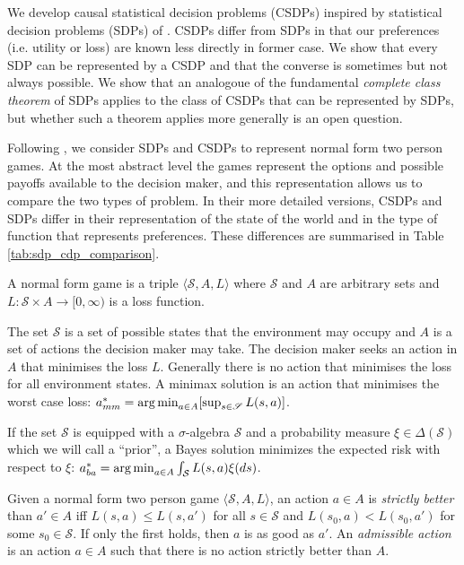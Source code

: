 We develop causal statistical decision problems (CSDPs) inspired by statistical decision problems (SDPs) of \citet{wald_statistical_1950}. CSDPs differ from SDPs in that our preferences (i.e. utility or loss) are known less directly in former case. We show that every SDP can be represented by a CSDP and that the converse is sometimes but not always possible. We show that an analogoue of the fundamental \emph{complete class theorem} of SDPs applies to the class of CSDPs that can be represented by SDPs, but whether such a theorem applies more generally is an open question.

Following \citep{toutenburg_ferguson_1967}, we consider SDPs and CSDPs to represent normal form two person games. At the most abstract level the games represent the options and possible payoffs available to the decision maker, and this representation allows us to compare the two types of problem. In their more detailed versions,  CSDPs and SDPs differ in their representation of the state of the world and in the type of function that represents preferences. These differences are summarised in Table \ref{tab:sdp_cdp_comparison}.

\begin{definition}
A normal form game is a triple $\langle \mathscr{S}, A, L\rangle$ where $\mathscr{S}$ and $A$ are arbitrary sets and $L:\mathscr{S}\times A\to [0,\infty)$ is a loss function.

\end{definition}
The set $\mathscr{S}$ is a set of possible states that the environment may occupy and $A$ is a set of actions the decision maker may take. The decision maker seeks an action in $A$ that minimises the loss $L$. Generally there is no action that minimises the loss for all environment states. A minimax solution is an action that minimises the worst case loss: $a^*_{mm} = \operatorname*{arg\,min}_{a\in A} [\sup_{s\in \mathscr{S}} L(s,a)]$.

If the set $\mathscr{S}$ is equipped with a $\sigma$-algebra $\mathcal{S}$ and a probability measure $\xi\in \Delta(\mathcal{S})$ which we will call a ``prior'', a Bayes solution minimizes the expected risk with respect to $\xi$: $a^*_{ba} = \operatorname*{arg\,min}_{a\in A} \int_{\mathcal{S}} L(s,a) \xi(ds)$.

\begin{definition}
Given a normal form two person game $\langle \mathscr{S}, A, L\rangle$, an action $a\in A$ is \emph{strictly better} than $a'\in A$ iff $L(s,a)\leq L(s,a')$ for all $s\in\mathscr{S}$ and $L(s_0,a)<L(s_0,a')$ for some $s_0\in \mathscr{S}$. If only the first holds, then $a$ is as good as $a'$. An \emph{admissible action} is an action $a\in A$ such that there is no action strictly better than $A$.
\end{definition}


